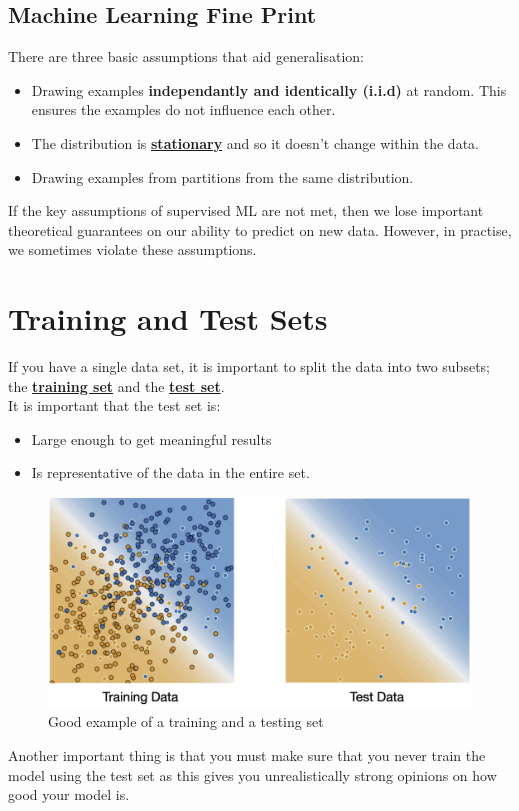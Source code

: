 \documentclass[12pt]{article}
\begin{document}
\subsection{Machine Learning Fine Print}
There are three basic assumptions that aid generalisation:
\begin{itemize}
	\item Drawing examples \textbf{independantly and identically (i.i.d)} at random. This ensures the examples do not influence each other.
	\item The distribution is \href{https://developers.google.com/machine-learning/glossary#stationarity}{\textbf{stationary}} and so it doesn't change within the data.
	\item Drawing examples from partitions from the same distribution.
\end{itemize}

If the key assumptions of supervised ML are not met, then we lose important theoretical guarantees on our ability to predict on new data. However, in practise, we sometimes violate these assumptions.

\section{Training and Test Sets}
If you have a single data set, it is important to split the data into two subsets; the \href{https://developers.google.com/machine-learning/glossary#training_set}{\textbf{training set}} and the \href{https://developers.google.com/machine-learning/glossary#test_set}{\textbf{test set}}.
\\It is important that the test set is:
\begin{itemize}
	\item Large enough to get meaningful results
	\item Is representative of the data in the entire set.
\end{itemize}
\begin{figure}[h]
	\centering
	\includegraphics[scale = 0.5]{imgs/GoodTrainingAndTesting.png}
	\caption{Good example of a training and a testing set}
\end{figure}
Another important thing is that you must make sure that you never train the model using the test set as this gives you unrealistically strong opinions on how good your model is.
\end{document}

